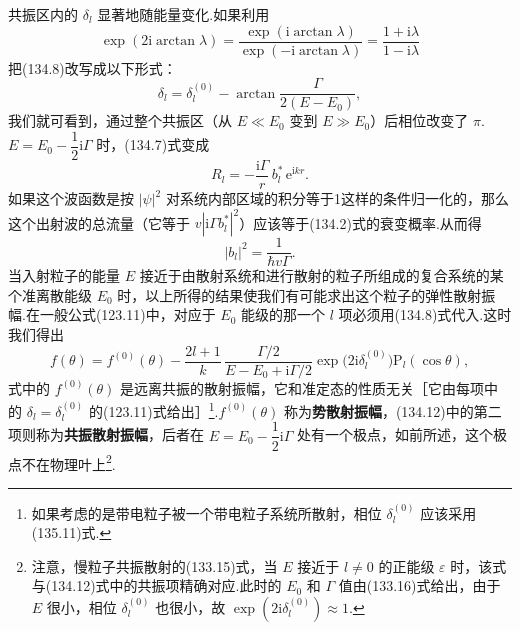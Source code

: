 共振区内的 $\delta_l$ 显著地随能量变化.如果利用
\begin{equation*}
  \exp\left(2\mathrm{i}\arctan\lambda\right)
  =\frac{\exp\left(\mathrm{i}\arctan\lambda\right)}
  {\exp\left(-\mathrm{i}\arctan\lambda\right)}
  =\frac{1+\mathrm{i}\lambda}{1-\mathrm{i}\lambda}
\end{equation*}
把(134.8)改写成以下形式：
\begin{equation}
  \delta_l=\delta_l^{(0)}
  -\arctan\frac{\Gamma}{2(E-E_0)},
\end{equation}
我们就可看到，通过整个共振区（从 $E\ll E_0$ 变到 $E\gg E_0$）后相位改变了 $\pi$.$E=E_0-\dfrac{1}{2}\mathrm{i}\Gamma$ 时，(134.7)式变成
\begin{equation*}
  R_l=-\frac{\mathrm{i}\Gamma}{r}\,b_l^{*}\,\mathrm{e}^{\mathrm{i}kr}.
\end{equation*}
如果这个波函数是按 $|\psi|^2$ 对系统内部区域的积分等于1这样的条件归一化的，那么这个出射波的总流量（它等于 $v|\mathrm{i}\Gamma b_l^{*}|^2$）应该等于(134.2)式的衰变概率.从而得
\begin{equation}
  |b_l|^2=\frac{1}{\hbar v\Gamma}.
\end{equation}
当入射粒子的能量 $E$ 接近于由散射系统和进行散射的粒子所组成的复合系统的某个准离散能级 $E_0$ 时，以上所得的结果使我们有可能求出这个粒子的弹性散射振幅.在一般公式(123.11)中，对应于 $E_0$ 能级的那一个 $l$ 项必须用(134.8)式代入.这时我们得出
\begin{equation}
  f(\theta)=f^{(0)}(\theta)
  -\frac{2l+1}{k}\,\frac{\Gamma/2}{E-E_0+\mathrm{i}\Gamma/2}
  \exp\bigl(2\mathrm{i}\delta_l^{(0)}\bigr)
  \mathrm{P}_l(\cos\theta),
\end{equation}
式中的 $f^{(0)}(\theta)$ 是远离共振的散射振幅，它和准定态的性质无关［它由每项中的 $\delta_l=\delta_l^{(0)}$ 的(123.11)式给出］\footnote{如果考虑的是带电粒子被一个带电粒子系统所散射，相位 $\delta_l^{(0)}$ 应该采用(135.11)式.}.$f^{(0)}(\theta)$ 称为\textbf{势散射振幅}，(134.12)中的第二项则称为\textbf{共振散射振幅}，后者在 $E=E_0-\dfrac{1}{2}\mathrm{i}\Gamma$ 处有一个极点，如前所述，这个极点不在物理叶上\footnote{注意，慢粒子共振散射的(133.15)式，当 $E$ 接近于 $l\neq0$ 的正能级 $\varepsilon$ 时，该式与(134.12)式中的共振项精确对应.此时的 $E_0$ 和 $\Gamma$ 值由(133.16)式给出，由于 $E$ 很小，相位 $\delta_l^{(0)}$ 也很小，故 $\exp(2\mathrm{i}\delta_l^{(0)})\approx1$.}.

